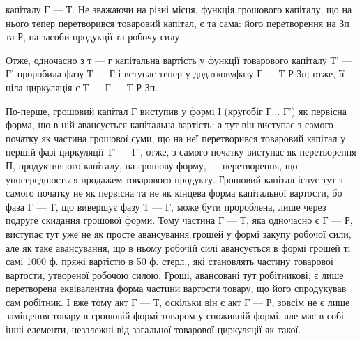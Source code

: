 \parcont{}  %
капіталу Г — Т. Не зважаючи на різні місця, функція грошового капіталу,
що на нього тепер перетворився товаровий капітал, є та сама: його
перетворення на Зп та Р, на засоби продукції та робочу силу.

Отже, одночасно з т — г капітальна вартість у функції товарового
капіталу Т' — Г' проробила фазу Т — Г і вступає тепер у додатковуфазу Г — Т Р Зп; отже, її ціла
циркуляція є Т — Г — Т Р Зп.

По-перше, грошовий капітал Г виступив у формі І (кругобіг Г... Г')
як первісна форма, що в ній авансується капітальна вартість; а тут він
виступає з самого початку як частина грошової суми, що на неї перетворився
товаровий капітал у першій фазі циркуляції Т' — Г', отже, з самого
початку виступає як перетворення П, продуктивного капіталу, на грошову
форму, — перетворення, що упосереднюється продажем товарового продукту.
Грошовий капітал існує тут з самого початку не як первісна та
не як кінцева форма капітальної вартости, бо фаза Г — Т, що вивершує
фазу Т — Г, може бути пророблена, лише через подруге скидання грошової
форми. Тому частина Г — Т, яка одночасно є Г — Р, виступає тут
уже не як просте авансування грошей у формі закупу робочої сили, але
як таке авансування, що в ньому робочій силі авансується в формі
грошей ті самі 1000 ф. пряжі вартістю в 50 ф. стерл., які становлять
частину товарової вартости, утвореної робочою силою. Гроші, авансовані
тут робітникові, є лише перетворена еквівалентна форма частини
вартости товару, що його спродукував сам робітник. І вже тому акт
Г — Т, оскільки він є акт Г — Р, зовсім не є лише заміщення товару в
грошовій формі товаром у споживній формі, але має в собі інші
елементи, незалежні від загальної товарової циркуляції як такої.

